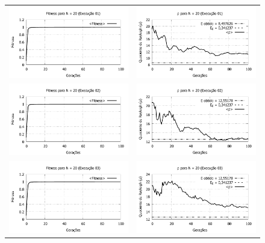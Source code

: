 \begin{figure}[phtb]
\centering
  \begin{tabular}{@{}cc@{}}
    \includegraphics[width=.40\textwidth]{figs/resultados/fitnessGrad/N20_01_fitness.pdf} &
    \includegraphics[width=.40\textwidth]{figs/resultados/fitnessGrad/N20_01_rho.pdf}   \\
		\includegraphics[width=.40\textwidth]{figs/resultados/fitnessGrad/N20_02_fitness.pdf} &
    \includegraphics[width=.40\textwidth]{figs/resultados/fitnessGrad/N20_02_rho.pdf}   \\
		\includegraphics[width=.40\textwidth]{figs/resultados/fitnessGrad/N20_03_fitness.pdf} &
    \includegraphics[width=.40\textwidth]{figs/resultados/fitnessGrad/N20_03_rho.pdf}   \\

\end{tabular}
\end{figure}
